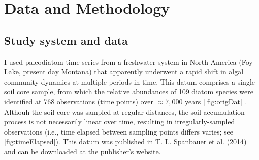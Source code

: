 \documentclass[12pt,twoside,openany]{reedthesis}
\begin{document}
\section{Data and Methodology}\label{data-and-methodology}

\subsection{Study system and data}\label{study-system-and-data}

I used paleodiatom time series from a freshwater system in North America
(Foy Lake, present day Montana) that apparently underwent a rapid shift
in algal community dynamics at multiple periods in time. This datum
comprises a single soil core sample, from which the relative abundances
of 109 diatom species were identified at 768 observations (time points)
over \(\approx7,000\) years {[}\ref{fig:origDat}{]}. Althouh the soil
core was sampled at regular distances, the soil accumulation process is
not necessarily linear over time, resulting in irregularly-sampled
observations (i.e., time elapsed between sampling points differs varies;
see \ref{fig:timeElapsed}). This datum was published in T. L. Spanbauer
et al. (2014) and can be downloaded at the publisher's website.
\end{document}
